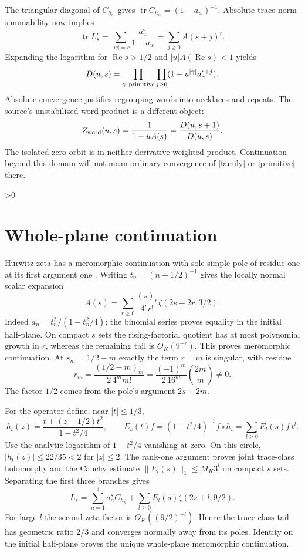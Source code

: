 \documentclass[10pt]{article}
\newcommand{\tr}{\operatorname{tr}}
\newcommand{\Ree}{\operatorname{Re}}
\begin{document}
The triangular diagonal of $C_{h_w}$ gives
$\tr C_{h_w}=(1-a_w)^{-1}$. Absolute trace-norm summability now implies
\[
 \tr L_s^r=\sum_{|w|=r}\frac{a_w^s}{1-a_w}
         =\sum_{j\ge0}A(s+j)^r.
\]
Expanding the logarithm for $\Ree s>1/2$ and $|u|A(\Ree s)<1$ yields
\begin{equation}\label{primitive}
 D(u,s)=\prod_{\gamma\ {\rm primitive}}\prod_{j\ge0}
       (1-u^{|\gamma|}a_\gamma^{s+j}).
\end{equation}
Absolute convergence justifies regrouping words into necklaces and repeats.
The source's unstabilized word product is a different object:
\[
 Z_{\rm word}(u,s)=\frac1{1-uA(s)}=\frac{D(u,s+1)}{D(u,s)}.
\]
The isolated zero orbit is in neither derivative-weighted product.
Continuation beyond this domain will not mean ordinary convergence
of \eqref{family} or \eqref{primitive} there.

\ifnum\CRevisionRound>0
\section{Whole-plane continuation}
Hurwitz zeta has a meromorphic continuation with sole simple pole of
residue one at its first argument one \cite{dlmf}.
Writing $t_n=(n+1/2)^{-1}$ gives the locally normal scalar expansion
\begin{equation}\label{scalar}
 A(s)=\sum_{r\ge0}\frac{(s)_r}{4^rr!}
           \zeta(2s+2r,3/2).
\end{equation}
Indeed $a_n=t_n^2/(1-t_n^2/4)$; the binomial series proves equality in
the initial half-plane. On compact $s$ sets the rising-factorial quotient
has at most polynomial growth in $r$, whereas the remaining tail is
$O_K(9^{-r})$. This proves meromorphic continuation.
At $s_m=1/2-m$ exactly the term $r=m$ is singular, with residue
\begin{equation}\label{scalarres}
 r_m=\frac{(1/2-m)_m}{2\,4^m m!}
     =\frac{(-1)^m}{2\,16^m}\binom{2m}{m}\ne0.
\end{equation}
The factor $1/2$ comes from the pole's argument $2s+2m$.

For the operator define, near $|t|\le1/3$,
\[
 h_t(z)=\frac{t+(z-1/2)t^2}{1-t^2/4},\qquad
 E_s(t)f=(1-t^2/4)^{-s} f\circ h_t
       =\sum_{l\ge0} E_l(s)f\,t^l.
\]
Use the analytic logarithm of $1-t^2/4$ vanishing at zero.
On this circle, $|h_t(z)|\le22/35<2$ for $|z|\le2$.
The rank-one argument proves joint trace-class holomorphy and the
Cauchy estimate $\|E_l(s)\|_1\le M_K3^l$ on compact $s$ sets.
Separating the first three branches gives
\begin{equation}\label{opcont}
 L_s=\sum_{n=1}^3a_n^s C_{h_n}
        +\sum_{l\ge0}E_l(s)\zeta(2s+l,9/2).
\end{equation}
For large $l$ the second zeta factor is $O_K((9/2)^{-l})$.
Hence the trace-class tail has geometric ratio $2/3$ and converges normally
away from its poles. Identity on the initial half-plane proves the unique
whole-plane meromorphic continuation.
\end{document}
